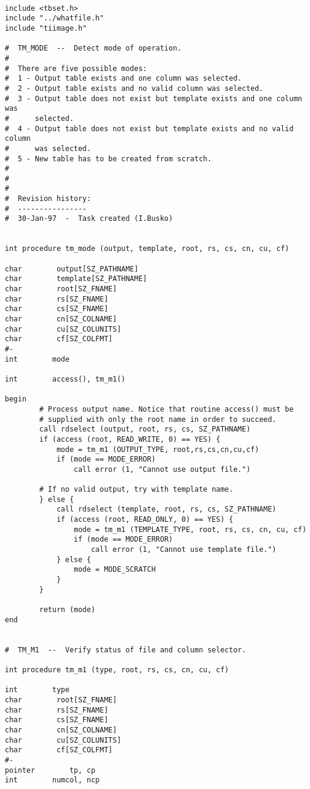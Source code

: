 \begin{verbatim}

include <tbset.h>
include "../whatfile.h"
include "tiimage.h"

#  TM_MODE  --  Detect mode of operation.
#
#  There are five possible modes:
#  1 - Output table exists and one column was selected.
#  2 - Output table exists and no valid column was selected.
#  3 - Output table does not exist but template exists and one column was 
#      selected.
#  4 - Output table does not exist but template exists and no valid column 
#      was selected.
#  5 - New table has to be created from scratch.
#
#
#
#  Revision history:
#  ----------------
#  30-Jan-97  -  Task created (I.Busko)


int procedure tm_mode (output, template, root, rs, cs, cn, cu, cf)

char        output[SZ_PATHNAME]
char        template[SZ_PATHNAME]
char        root[SZ_FNAME]
char        rs[SZ_FNAME]
char        cs[SZ_FNAME]
char        cn[SZ_COLNAME]
char        cu[SZ_COLUNITS]
char        cf[SZ_COLFMT]
#-
int        mode

int        access(), tm_m1()

begin
        # Process output name. Notice that routine access() must be 
        # supplied with only the root name in order to succeed.
        call rdselect (output, root, rs, cs, SZ_PATHNAME)
        if (access (root, READ_WRITE, 0) == YES) {
            mode = tm_m1 (OUTPUT_TYPE, root,rs,cs,cn,cu,cf)
            if (mode == MODE_ERROR)
                call error (1, "Cannot use output file.")

        # If no valid output, try with template name.
        } else {
            call rdselect (template, root, rs, cs, SZ_PATHNAME)
            if (access (root, READ_ONLY, 0) == YES) {
                mode = tm_m1 (TEMPLATE_TYPE, root, rs, cs, cn, cu, cf)
                if (mode == MODE_ERROR)
                    call error (1, "Cannot use template file.")
            } else {
                mode = MODE_SCRATCH
            }
        }

        return (mode)
end


#  TM_M1  --  Verify status of file and column selector.

int procedure tm_m1 (type, root, rs, cs, cn, cu, cf)

int        type
char        root[SZ_FNAME]
char        rs[SZ_FNAME]
char        cs[SZ_FNAME]
char        cn[SZ_COLNAME]
char        cu[SZ_COLUNITS]
char        cf[SZ_COLFMT]
#-
pointer        tp, cp
int        numcol, ncp


\end{verbatim}
